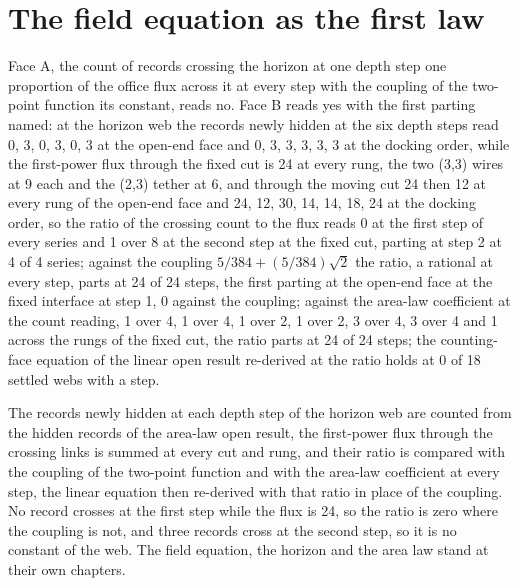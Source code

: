 \section{The field equation as the first law}\label{mod:X-2-D543764-w-flfw}
\begin{chwall}\label{box:X-2-D543764-w-flfw:1}
Face A, the count of records crossing the horizon at one depth step one proportion of the office flux across it at every step with the coupling of the two-point function its constant, reads no. Face B reads yes with the first parting named: at the horizon web the records newly hidden at the six depth steps read 0, 3, 0, 3, 0, 3 at the open-end face and 0, 3, 3, 3, 3, 3 at the docking order, while the first-power flux through the fixed cut is 24 at every rung, the two (3,3) wires at 9 each and the (2,3) tether at 6, and through the moving cut 24 then 12 at every rung of the open-end face and 24, 12, 30, 14, 14, 18, 24 at the docking order, so the ratio of the crossing count to the flux reads 0 at the first step of every series and 1 over 8 at the second step at the fixed cut, parting at step 2 at 4 of 4 series; against the coupling $5/384 + (5/384)\sqrt{2}$ the ratio, a rational at every step, parts at 24 of 24 steps, the first parting at the open-end face at the fixed interface at step 1, 0 against the coupling; against the area-law coefficient at the count reading, 1 over 4, 1 over 4, 1 over 2, 1 over 2, 3 over 4, 3 over 4 and 1 across the rungs of the fixed cut, the ratio parts at 24 of 24 steps; the counting-face equation of the linear open result re-derived at the ratio holds at 0 of 18 settled webs with a step.
\end{chwall}
The records newly hidden at each depth step of the horizon web are counted from the hidden records of the area-law open result, the first-power flux through the crossing links is summed at every cut and rung, and their ratio is compared with the coupling of the two-point function and with the area-law coefficient at every step, the linear equation then re-derived with that ratio in place of the coupling. No record crosses at the first step while the flux is 24, so the ratio is zero where the coupling is not, and three records cross at the second step, so it is no constant of the web. The field equation, the horizon and the area law stand at their own chapters.
